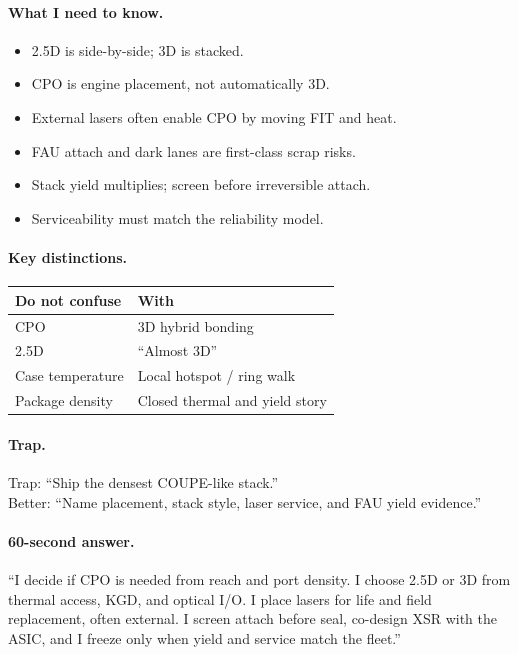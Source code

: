 \paragraph{What I need to know.}
\begin{itemize}
\item 2.5D is side-by-side; 3D is stacked.
\item CPO is engine placement, not automatically 3D.
\item External lasers often enable CPO by moving FIT and heat.
\item FAU attach and dark lanes are first-class scrap risks.
\item Stack yield multiplies; screen before irreversible attach.
\item Serviceability must match the reliability model.
\end{itemize}

\paragraph{Key distinctions.}
\begin{center}
\footnotesize
\begin{tabular}{@{}ll@{}}
\toprule
Do not confuse & With \\
\midrule
CPO & 3D hybrid bonding \\
2.5D & ``Almost 3D'' \\
Case temperature & Local hotspot / ring walk \\
Package density & Closed thermal and yield story \\
\bottomrule
\end{tabular}
\end{center}

\paragraph{Trap.}
Trap: ``Ship the densest COUPE-like stack.''\\
Better: ``Name placement, stack style, laser service, and FAU yield evidence.''

\paragraph{60-second answer.}
``I decide if CPO is needed from reach and port density. I choose 2.5D or 3D
from thermal access, KGD, and optical I/O. I place lasers for life and field
replacement, often external. I screen attach before seal, co-design XSR with
the ASIC, and I freeze only when yield and service match the fleet.''

